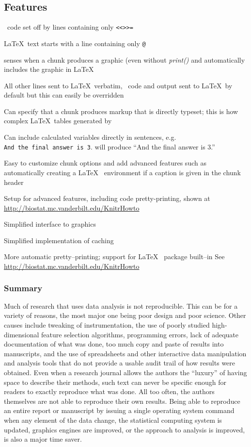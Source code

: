 \subsection{ Features}
\bi
\item \R\ code set off by lines containing only \verb|<<>>=|
\item \LaTeX\ text starts with a line containing only \verb|@|
\item {} senses when a chunk produces a graphic (even without
  \emph{print()} and
  automatically includes the graphic in \LaTeX
\item All other lines sent to \LaTeX\ verbatim, \R\ code and output sent to
  \LaTeX\ by default but this can easily be overridden
\item Can specify that a chunk produces markup that is directly
  typeset; this is how complex \LaTeX\ tables generated by \R
\item Can include calculated variables directly in sentences, e.g.\\
 \verb|And the final answer is 3|.
 will produce ``And the final answer is 3.''
\item Easy to customize chunk options and add advanced features such
  as automatically creating a \LaTeX\  environment if a
  caption is given in the chunk header
\item Setup for advanced features, including code pretty-printing,
  shown at \url{http://biostat.mc.vanderbilt.edu/KnitrHowto}
\item Simplified interface to  graphics
\item Simplified implementation of caching
\item More automatic pretty--printing; support
  for \LaTeX\  package built--in
\ei
See  \url{http://biostat.mc.vanderbilt.edu/KnitrHowto}

\subsubsection{Summary}
{\smaller[2]
Much of research that uses data analysis is not reproducible.
This can be for a variety of reasons, the most major one being poor
design and poor science.  Other causes include tweaking of
instrumentation, the use of poorly studied high-dimensional feature
selection algorithms, programming errors, lack of adequate
documentation of what was done, too much copy and paste of results
into manuscripts, and the use of spreadsheets and other interactive
data manipulation and analysis tools that do not provide a usable
audit trail of how results were obtained.  Even when a research
journal allows the authors the ``luxury'' of having space to describe
their methods, such text can never be specific enough for readers to
exactly reproduce what was done.  All too often, the authors
themselves are not able to reproduce their own results.  Being able to
reproduce an entire report or manuscript by issuing a single operating
system command when any element of the data change, the statistical
computing system is updated, graphics engines are improved, or the
approach to analysis is improved, is also a major time saver.}

